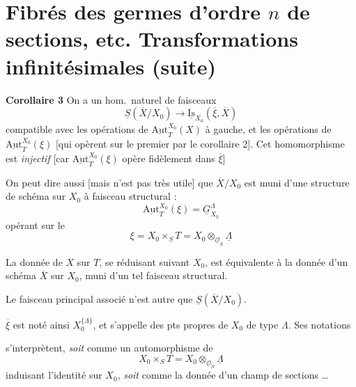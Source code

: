 \documentclass[11pt,a4paper]{article}
\begin{document}
\section{Fibrés des germes d'ordre $n$ de sections, etc. Transformations
infinitésimales (suite)}

\textbf{Corollaire 3} On a un hom.\ naturel de faisceaux
\[
  \underline{S}(\overline{X}/X_{0}) \longrightarrow
  \underline{\mathrm{Is}}_{X_{0}}(\overline{\xi}, \overline{X})
\]
compatible avec les opérations de $\underline{\mathrm{Aut}}^{X_0}_{T}(X)$
à gauche, et les opérations  de
$\underline{\mathrm{Aut}}^{X_0}_{T}(\xi)$ [qui opèrent sur le premier
\ill{} par le corollaire 2]. Cet homomorphisme est \emph{injectif} [car
$\underline{\mathrm{Aut}}^{X_0}_{T}(\xi)$ opère fidèlement dans
$\overline{\xi}$]

On peut dire aussi [mais \ill{} n'est pas très utile] que
$\overline{X}/X_{0}$ est muni d'une structure de  schéma sur
$X_{0}$ à faisceau structural :
\[
  \boxed{\;\underline{\mathrm{Aut}}^{X_0}_{T}(\xi) =
  \underline{G}^{\Lambda}_{X_{0}}\;}
\]
opérant sur le 
\[
  \xi = X_{0} \times_{S} T = X_{0} \otimes_{\underline{\mathcal{O}}_{S}}
  \underline{\Lambda}
\]

La donnée de $X$ \ill{} sur $T$, se réduisant suivant $X_{0}$, est
équivalente à la donnée d'un schéma $\overline{X}$ sur $X_{0}$, muni d'un
tel faisceau structural.

Le faisceau principal associé n'est autre que
$\underline{S}(\overline{X}/X_{0})$.

$\overline{\xi}$ est noté ainsi $X_{0}^{\{\Lambda\}}$, et s'appelle \ill{}
\struck{\ill{}} des pts propres de $X_{0}$ de type $\Lambda$. Ses notations
\struck{\ill{}} \ill{}

s'interprètent, \emph{soit} comme un automorphisme de
\[
  X_{0} \times_{S} T = X_{0} \otimes_{\underline{\mathcal{O}}_{S}}
  \underline{\Lambda}
\]
induisant l'identité sur $X_{0}$, \emph{soit} comme la donnée d'un champ de
sections \struck{\ill{}} \ldots
{}
\end{document}
